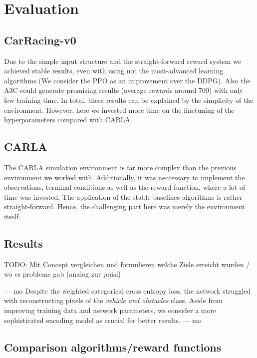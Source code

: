 \documentclass[letterpaper, 10 pt, conference]{ieeeconf}  %
\begin{document}

\section{Evaluation}
\subsection{CarRacing-v0}
Due to the simple input structure and the straight-forward reward system we achieved stable results, even with using not the most-advanced learning algorithms (We consider the PPO as an improvement over the DDPG). Also the A3C could generate promising results (average rewards around 700) with only few training time.  In total, these results can be explained by the simplicity of the environment. However, here we invested more time on the finetuning of the hyperparameters compared with CARLA.
\subsection{CARLA}
The CARLA simulation environment is far more complex than the previous environment we worked with. Additionally, it was neccessary to implement the observations, terminal conditions as well as the reward function, where a lot of time was invested. The application of the stable-baselines algorithms is rather straight-forward. Hence, the challenging part here was merely the environment itself. 
\subsection{Results}
TODO: Mit Concept vergleichen und formulieren welche Ziele erreicht wurden / wo es probleme gab (analog zur präsi)

--- mo
Despite the weighted categorical cross entropy loss, the network struggled with
reconstructing pixels of the \textit{vehicle and obstacles} class. 
Aside from improving training data and network parameters, we 
consider a more sophisticated encoding model as crucial for better results. 
--- mo
\subsection{Comparison algorithms/reward functions}
\end{document}
